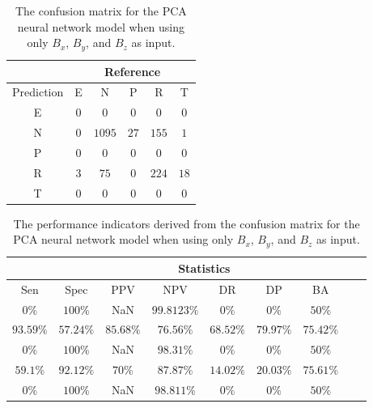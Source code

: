 \begin{table}[!ht]
	\centering
	\begin{tabular}{|c|c|c|c|c|c|}
		\hline
		 & \multicolumn{5}{|c|}{Reference} \\ \hline
		 Prediction & E & N & P & R & T \\ \hline
		 E & $0$ & $0$ & $0$ & $0$ & $0$ \\ \hline
		 N & $0$ & $1095$ & $27$ & $155$ & $1$ \\ \hline
		 P & $0$ & $0$ & $0$ & $0$ & $0$ \\ \hline
		 R & $3$ & $75$ & $0$ & $224$ & $18$ \\ \hline
		 T & $0$ & $0$ & $0$ & $0$ & $0$ \\ \hline
	\end{tabular}
	\caption{The confusion matrix for the PCA neural network model when using only $B_{x}$, $B_{y}$, and $B_{z}$ as input.}
	\label{tab:cm:coord:pcaNNet}
\end{table}

\begin{table}[!ht]
	\centering
	\begin{tabular}{|c|c|c|c|c|c|c|c|c|}
		\hline
		 & \multicolumn{7}{c|}{Statistics} \\ \hline
		Sen & Spec & PPV & NPV & DR & DP & BA \\ \hline
		$0\%$ & $100\%$ & NaN & $99.8123\%$ & $0\%$ & $0\%$ & $50\%$ \\ \hline
		$93.59\%$ & $57.24\%$ & $85.68\%$ & $76.56\%$ & $68.52\%$ & $79.97\%$ & $75.42\%$ \\ \hline
		$0\%$ & $100\%$ & NaN & $98.31\%$ & $0\%$ & $0\%$ & $50\%$ \\ \hline
		$59.1\%$ & $92.12\%$ & $70\%$ & $87.87\%$ & $14.02\%$ & $20.03\%$ & $75.61\%$ \\ \hline
		$0\%$ & $100\%$ & NaN & $98.811\%$ & $0\%$ & $0\%$ & $50\%$ \\ \hline
	\end{tabular}
	\caption{The performance indicators derived from the confusion matrix for the PCA neural network model when using only $B_{x}$, $B_{y}$, and $B_{z}$ as input.}
	\label{tab:cs:coord:pcaNNet}
\end{table}

